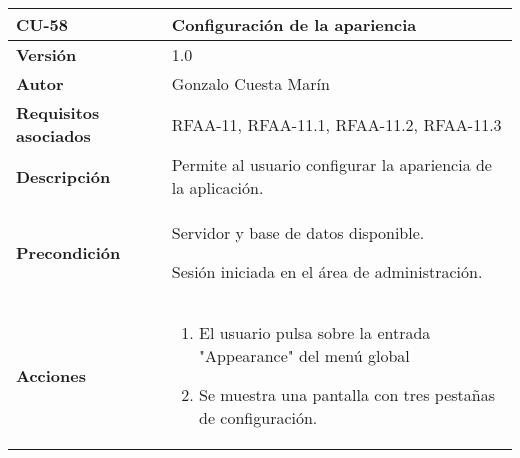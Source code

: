 \begin{longtable}[]{@{}ll@{}}
\toprule
\begin{minipage}[b]{0.22\columnwidth}\raggedright
\textbf{CU-58}\strut
\end{minipage} & \begin{minipage}[b]{0.72\columnwidth}\raggedright
\textbf{Configuración de la apariencia}\strut
\end{minipage}\tabularnewline
\midrule
\endhead
\begin{minipage}[t]{0.22\columnwidth}\raggedright
\textbf{Versión}\strut
\end{minipage} & \begin{minipage}[t]{0.72\columnwidth}\raggedright
1.0\strut
\end{minipage}\tabularnewline
\begin{minipage}[t]{0.22\columnwidth}\raggedright
\textbf{Autor}\strut
\end{minipage} & \begin{minipage}[t]{0.72\columnwidth}\raggedright
Gonzalo Cuesta Marín\strut
\end{minipage}\tabularnewline
\begin{minipage}[t]{0.22\columnwidth}\raggedright
\textbf{Requisitos asociados}\strut
\end{minipage} & \begin{minipage}[t]{0.72\columnwidth}\raggedright
RFAA-11, RFAA-11.1, RFAA-11.2, RFAA-11.3\strut
\end{minipage}\tabularnewline
\begin{minipage}[t]{0.22\columnwidth}\raggedright
\textbf{Descripción}\strut
\end{minipage} & \begin{minipage}[t]{0.72\columnwidth}\raggedright
Permite al usuario configurar la apariencia de la aplicación.\strut
\end{minipage}\tabularnewline
\begin{minipage}[t]{0.22\columnwidth}\raggedright
\textbf{Precondición}\strut
\end{minipage} & \begin{minipage}[t]{0.72\columnwidth}\raggedright
Servidor y base de datos disponible.

Sesión iniciada en el área de administración.\strut
\end{minipage}\tabularnewline
\begin{minipage}[t]{0.22\columnwidth}\raggedright
\textbf{Acciones}\strut
\end{minipage} & \begin{minipage}[t]{0.72\columnwidth}\raggedright
\begin{enumerate}
\def\labelenumi{\arabic{enumi}.}
\tightlist
\item
  El usuario pulsa sobre la entrada "Appearance" del menú global
\item
  Se muestra una pantalla con tres pestañas de configuración.


\end{enumerate}
\end{minipage}
\end{longtable}
